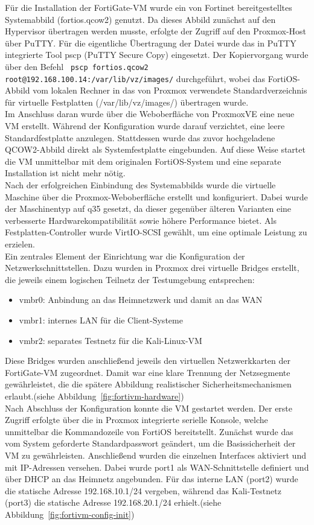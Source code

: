 Für die Installation der FortiGate-VM wurde ein von Fortinet bereitgestelltes Systemabbild (fortios.qcow2) genutzt. Da dieses Abbild zunächst auf den Hypervisor übertragen werden musste, erfolgte der Zugriff auf den Proxmox-Host über PuTTY. Für die eigentliche Übertragung der Datei wurde das in PuTTY integrierte Tool pscp (PuTTY Secure Copy) eingesetzt. Der Kopiervorgang wurde über den Befehl \verb| pscp fortios.qcow2 root@192.168.100.14:/var/lib/vz/images/| durchgeführt, wobei das FortiOS-Abbild vom lokalen Rechner in das von Proxmox verwendete Standardverzeichnis für virtuelle Festplatten (/var/lib/vz/images/) übertragen wurde.\\
Im Anschluss daran wurde über die Weboberfläche von ProxmoxVE eine neue VM erstellt. Während der Konfiguration wurde darauf verzichtet, eine leere Standardfestplatte anzulegen. Stattdessen wurde das zuvor hochgeladene QCOW2-Abbild direkt als Systemfestplatte eingebunden. Auf diese Weise startet die VM unmittelbar mit dem originalen FortiOS-System und eine separate Installation ist nicht mehr nötig.\\

Nach der erfolgreichen Einbindung des Systemabbilds wurde die virtuelle Maschine über die Proxmox-Weboberfläche erstellt und konfiguriert. Dabei wurde der Maschinentyp auf q35 gesetzt, da dieser gegenüber älteren Varianten eine verbesserte Hardwarekompatibilität sowie höhere Performance bietet. Als Festplatten-Controller wurde VirtIO-SCSI gewählt, um eine optimale Leistung zu erzielen.\cite{ProxmoxVE}\\
Ein zentrales Element der Einrichtung war die Konfiguration der Netzwerkschnittstellen. Dazu wurden in Proxmox drei virtuelle Bridges erstellt, die jeweils einem logischen Teilnetz der Testumgebung entsprechen:
\begin{itemize}
	\item vmbr0: Anbindung an das Heimnetzwerk und damit an das WAN
	\item vmbr1: internes LAN für die Client-Systeme
	\item vmbr2: separates Testnetz für die Kali-Linux-VM
\end{itemize}
Diese Bridges wurden anschließend jeweils  den virtuellen Netzwerkkarten der FortiGate-VM zugeordnet. Damit war eine klare Trennung der Netzsegmente gewährleistet, die die spätere Abbildung realistischer Sicherheitsmechanismen erlaubt.(siehe Abbildung~\ref{fig:fortivm-hardware})\\

Nach Abschluss der Konfiguration konnte die VM gestartet werden. Der erste Zugriff erfolgte über die in Proxmox integrierte serielle Konsole, welche unmittelbar die Kommandozeile von FortiOS bereitstellt. Zunächst wurde das vom System geforderte Standardpasswort geändert, um die Basissicherheit der VM zu gewährleisten. Anschließend wurden die einzelnen Interfaces aktiviert und mit IP-Adressen versehen. Dabei wurde port1 als WAN-Schnittstelle definiert und über DHCP an das Heimnetz angebunden. Für das interne LAN (port2) wurde die statische Adresse 192.168.10.1/24 vergeben, während das Kali-Testnetz (port3) die statische Adresse 192.168.20.1/24 erhielt.(siehe Abbildung~\ref{fig:fortivm-config-init})

